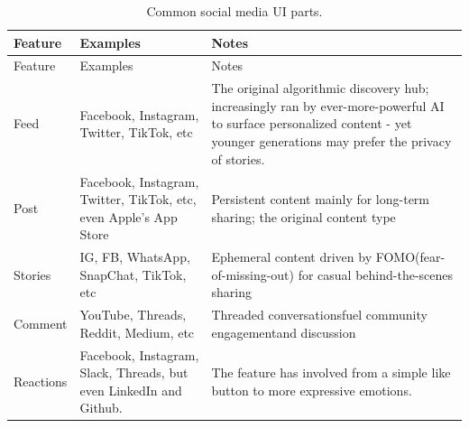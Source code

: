 \documentclass[
  12pt,
  letterpaper,
  DIV=11,
  numbers=noendperiod]{scrartcl}
\begin{document}
\begin{longtable}[]{@{}
  >{\raggedright\arraybackslash}p{}
  >{\raggedright\arraybackslash}p{}
  >{\raggedright\arraybackslash}p{}@{}}
\caption[Common Social Media UI Parts]{Common social media UI
parts.}\tabularnewline
\toprule\noalign{}
\begin{minipage}[b]{\linewidth}\raggedright
Feature
\end{minipage} & \begin{minipage}[b]{\linewidth}\raggedright
Examples
\end{minipage} & \begin{minipage}[b]{\linewidth}\raggedright
Notes
\end{minipage} \\
\midrule\noalign{}
\endfirsthead
\toprule\noalign{}
\begin{minipage}[b]{\linewidth}\raggedright
Feature
\end{minipage} & \begin{minipage}[b]{\linewidth}\raggedright
Examples
\end{minipage} & \begin{minipage}[b]{\linewidth}\raggedright
Notes
\end{minipage} \\
\midrule\noalign{}
\endhead
\bottomrule\noalign{}
\endlastfoot
Feed & Facebook, Instagram, Twitter, TikTok, etc & The original
algorithmic discovery hub; increasingly ran by ever-more-powerful AI to
surface personalized content - yet younger generations may prefer the
privacy of stories. \\
Post & Facebook, Instagram, Twitter, TikTok, etc, even Apple's App Store
& Persistent content mainly for long-term sharing; the original content
type \\
Stories & IG, FB, WhatsApp, SnapChat, TikTok, etc & Ephemeral content
driven by FOMO(fear-of-missing-out) for casual behind-the-scenes
sharing \\
Comment & YouTube, Threads, Reddit, Medium, etc & Threaded
conversationsfuel community engagementand discussion \\
Reactions & Facebook, Instagram, Slack, Threads, but even LinkedIn and
Github. & The feature has involved from a simple like button to more
expressive emotions. \\
\end{longtable}

\let\pandoctableshortcapt\relax
\end{document}
